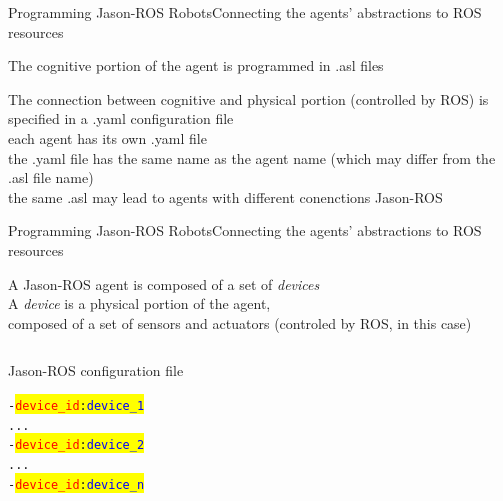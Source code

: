 \documentclass[compress]{beamer}
\newcommand{\yamlkey}[1]{\textcolor{red}{\texttt{#1}}}
\newcommand{\yamlvalue}[1]{\textcolor{blue}{\texttt{#1}}}
\begin{document}
\begin{frame}{Programming Jason-ROS Robots}{Connecting the agents' abstractions to ROS resources}

The cognitive portion of the agent is programmed in .asl files\\ \vspace{.5cm}
 
The connection between cognitive and physical portion (controlled by ROS)
is specified in a .yaml configuration file\\ \vspace{-.2cm}
{\tiny each agent has its own .yaml file}\\ \vspace{-.2cm}
{\tiny the .yaml file has the same name as the agent name (which may differ from the .asl file name)}\\ \vspace{-.2cm}
{\tiny the same .asl may lead to agents with different conenctions Jason-ROS}

 
\end{frame}



\begin{frame}[fragile]{Programming Jason-ROS Robots}{Connecting the agents' abstractions to ROS resources}

    \footnotesize
    
    A Jason-ROS agent is composed of a set of \textit{devices}\\
    
    A \textit{device} is a physical portion of the agent,\\ composed of a set of sensors and actuators {\tiny (\tiny controled by ROS, in this case)}
    
    \vspace{.5cm}
    
  \begin{columns}
            \begin{block}{{\ssmall Jason-ROS configuration file}}
                \scriptsize
                \begin{alltt} \tiny
- \colorbox{yellow}{\yamlkey{device\_id}: \yamlvalue{device_1}}
    ...
- \colorbox{yellow}{\yamlkey{device\_id}: \yamlvalue{device_2}}      
    ...
- \colorbox{yellow}{\yamlkey{device\_id}: \yamlvalue{device_n}}    
                \end{alltt}

            \end{block}    
 \end{columns}
\end{frame}
\end{document}
